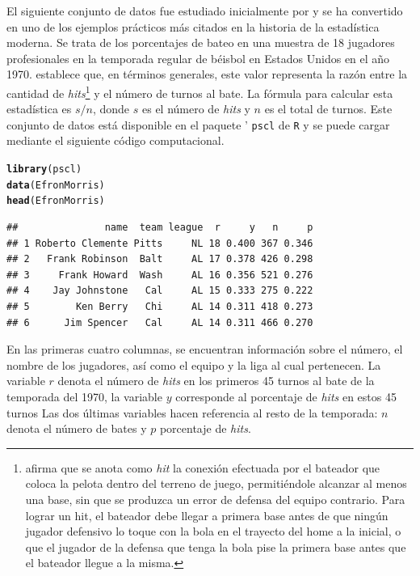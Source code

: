 \documentclass[10pt,openright]{book}\usepackage[]{graphicx}\usepackage[]{color}
\makeatletter
\newcommand{\hlstd}[1]{\textcolor[rgb]{0.345,0.345,0.345}{#1}}%
\newcommand{\hlkwd}[1]{\textcolor[rgb]{0.737,0.353,0.396}{\textbf{#1}}}%
\newenvironment{kframe}{%
 \def\at@end@of@kframe{}%
 \ifinner\ifhmode%
  \def\at@end@of@kframe{\end{minipage}}%
  \begin{minipage}{\columnwidth}%
 \fi\fi%
 \def\FrameCommand##1{\hskip\@totalleftmargin \hskip-\fboxsep
 \colorbox{shadecolor}{##1}\hskip-\fboxsep
     \hskip-\linewidth \hskip-\@totalleftmargin \hskip\columnwidth}%
 \MakeFramed {\advance\hsize-\width
   \@totalleftmargin\z@ \linewidth\hsize
   \@setminipage}}%
 {\par\unskip\endMakeFramed%
 \at@end@of@kframe}
\newenvironment{knitrout}{}{} %
\makeatother
\begin{document}
    \begin{Eje}\label{Beisbol}
    El siguiente conjunto de datos fue estudiado inicialmente por  y se ha convertido en uno de los ejemplos pr\'acticos m\'as citados en la historia de la estad\'istica moderna. Se trata de los porcentajes de bateo en una muestra de 18 jugadores profesionales en la temporada regular de b\'eisbol en Estados Unidos en el a\~no 1970.  establece que, en t\'erminos generales, este valor representa la raz\'on entre la cantidad de \emph{hits}\footnote{ afirma que se anota como \emph{hit} la conexi\'on efectuada por el bateador que coloca la pelota dentro del terreno de juego, permiti\'endole alcanzar al menos una base, sin que se produzca un error de defensa del equipo contrario. Para lograr un hit, el bateador debe llegar a primera base antes de que ning\'un jugador defensivo lo toque con la bola en el trayecto del home a la inicial, o que el jugador de la defensa que tenga la bola pise la primera base antes que el bateador llegue a la misma.} y el n\'umero de turnos al bate. La f\'ormula para calcular esta estad\'istica es $s/n$, donde $s$ es el n\'umero de \emph{hits} y $n$ es el total de turnos.
    Este conjunto de datos est\'a disponible en el paquete ' \verb'pscl' de \verb'R' y se puede cargar mediante el siguiente c\'odigo computacional.

\begin{knitrout}
\color{fgcolor}\begin{kframe}
\begin{alltt}
\hlkwd{library}\hlstd{(pscl)}
\hlkwd{data}\hlstd{(EfronMorris)}
\hlkwd{head}\hlstd{(EfronMorris)}
\end{alltt}
\begin{verbatim}
##               name  team league  r     y   n     p
## 1 Roberto Clemente Pitts     NL 18 0.400 367 0.346
## 2   Frank Robinson  Balt     AL 17 0.378 426 0.298
## 3     Frank Howard  Wash     AL 16 0.356 521 0.276
## 4    Jay Johnstone   Cal     AL 15 0.333 275 0.222
## 5        Ken Berry   Chi     AL 14 0.311 418 0.273
## 6      Jim Spencer   Cal     AL 14 0.311 466 0.270
\end{verbatim}
\end{kframe}
\end{knitrout}
    
En las primeras cuatro columnas, se encuentran informaci\'on sobre el n\'umero, el nombre de los jugadores, as\'i como el equipo y la liga al cual pertenecen. La variable $r$ denota el n\'umero de \emph{hits} en los primeros 45 turnos al bate de la temporada del 1970, la variable $y$ corresponde al porcentaje de \emph{hits} en estos 45 turnos Las dos \'ultimas variables hacen referencia al resto de la temporada: $n$ denota el n\'umero de bates y $p$ porcentaje de \emph{hits}. 
    

\end{Eje}
\end{document}
